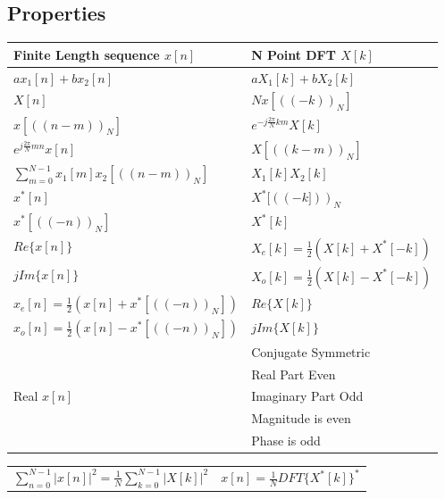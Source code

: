 \documentclass{article}
\begin{document}
\subsection*{Properties}
\begin{center}
    \begin{tabularx}{\textwidth}{XX}
        \hline
        Finite Length sequence $x[n]$ & N Point DFT $X[k]$\\
        \hline
        $ax_1[n] + bx_2[n]$ & $aX_1[k]+bX_2[k]$\\
        $X[n]$ & $Nx[((-k))_N]$\\
        $x[((n-m))_N]$ & $e^{-j\frac{2\pi}{N}km}X[k]$\\
        $e^{j\frac{2\pi}{N}mn}x[n]$ & $X[((k-m))_N]$\\
        $\sum_{m=0}^{N-1}{x_1[m]x_2[((n-m))_N]}$ & $X_1[k]X_2[k]$\\
        $x^*[n]$ & $X^*[((-k]))_N$\\
        $x^*[((-n))_N]$ & $X^*[k]$\\
        $Re\{x[n]\}$ & $X_e[k] = \frac{1}{2}\left(X[k]+X^*[-k]\right)$\\
        $jIm\{x[n]\}$ & $X_o[k] = \frac{1}{2}\left(X[k]-X^*[-k]\right)$\\
        $x_e[n] = \frac{1}{2}\left(x[n]+x^*[((-n))_N]\right)$ & $Re\{X[k]\}$\\
        $x_o[n] = \frac{1}{2}\left(x[n]-x^*[((-n))_N]\right)$ & $jIm\{X[k]\}$\\
        \hline
        & Conjugate Symmetric\\
        & Real Part Even\\
        Real $x[n]$ & Imaginary Part Odd\\
        & Magnitude is even\\
        & Phase is odd
    \end{tabularx}
\end{center}
\begin{center}
    \begin{tabularx}{\textwidth - 1in}{XX}
        $\sum_{n=0}^{N-1}|x[n]|^2 = \frac{1}{N}\sum_{k=0}^{N-1}|X[k]|^2$ & $x[n]=\frac{1}{N}DFT\{X^*[k]\}^*$
    \end{tabularx}
\end{center}
\end{document}
